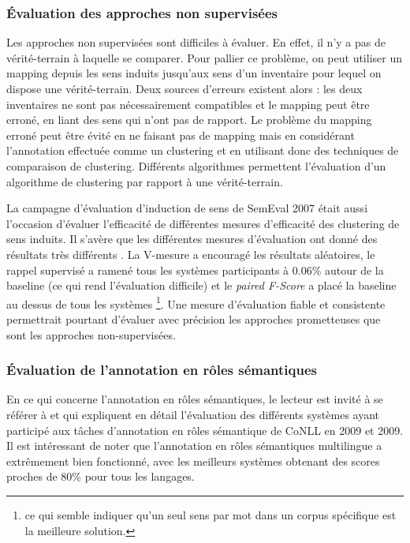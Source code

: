 \subsubsection{Évaluation des approches non supervisées}
\label{evalunsupervised}

Les approches non supervisées sont difficiles à évaluer. En effet, il n'y a pas
de vérité-terrain à laquelle se comparer. Pour pallier ce problème, on peut
utiliser un mapping depuis les sens induits jusqu'aux sens d'un inventaire pour
lequel on dispose une vérité-terrain. Deux sources d'erreurs existent alors :
les deux inventaires ne sont pas nécessairement compatibles et le mapping peut
être erroné, en liant des sens qui n'ont pas de rapport. Le problème du mapping
erroné peut être évité en ne faisant pas de mapping mais en considérant
l'annotation effectuée comme un clustering et en utilisant donc des techniques
de comparaison de clustering. Différents algorithmes permettent l'évaluation
d'un algorithme de clustering par rapport à une vérité-terrain.

La campagne d'évaluation d'induction de sens de SemEval 2007
\citep{manandhar2010semeval} était aussi l'occasion d'évaluer l'efficacité de
différentes mesures d'efficacité des clustering de sens induits. Il s'avère que
les différentes mesures d'évaluation ont donné des résultats très différents
\citep{pedersen2010duluth}. La V-mesure a encouragé les résultats aléatoires,
le rappel supervisé a ramené tous les systèmes participants à 0.06\% autour de
la baseline (ce qui rend l'évaluation difficile) et le \textit{paired F-Score}
a placé la baseline au dessus de tous les systèmes \footnote{ce qui semble
indiquer qu'un seul sens par mot dans un corpus spécifique est la meilleure
solution.}. Une mesure d'évaluation fiable et consistente permettrait pourtant
d'évaluer avec précision les approches prometteuses que sont les approches
non-supervisées.

\subsubsection{Évaluation de l'annotation en rôles sémantiques}
En ce qui concerne l'annotation en rôles sémantiques, le lecteur est invité à
se référer à \citep{surdeanu2008conll} et \citep{hajic2009conll} qui expliquent
en détail l'évaluation des différents systèmes ayant participé aux tâches
d'annotation en rôles sémantique de CoNLL en 2009 et 2009. Il est intéressant
de noter que l'annotation en rôles sémantiques multilingue a extrêmement bien
fonctionné, avec les meilleurs systèmes obtenant des scores proches de 80\%
pour tous les langages.

